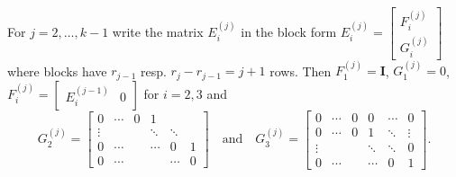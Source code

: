 \documentclass[11pt]{amsart}
\theoremstyle{definition}
\newcommand{\II}{\mathbf{I}}
\begin{document}
For $j=2,\ldots ,k-1$ write the matrix $E_i^{(j)}$ in the block form $E_i^{(j)}=\begin{bmatrix} F_i^{(j)} \\ G_i^{(j)}\end{bmatrix}$ where blocks have $r_{j-1}$ resp. $r_j-r_{j-1}=j+1$ rows. Then $F_1^{(j)}=\II$, $G_1^{(j)}=0$, $F_i^{(j)}=\begin{bmatrix}E_i^{(j-1)} & 0 \end{bmatrix}$ for $i=2,3$ and
\begin{equation}\label{eq: G_i}
G_2^{(j)}=\begin{bmatrix}
0 & \cdots & 0 & 1\\
\vdots & & & \ddots & \ddots\\
0 & \cdots & & \cdots & 0 & 1\\
0 & \cdots & & & \cdots & 0
\end{bmatrix} \quad \mathrm{and}\quad G_3^{(j)}=\begin{bmatrix}
0 & \cdots & 0 & 0 & \cdots & 0\\
0 & \cdots & 0 & 1 & \ddots & \vdots \\
\vdots & &  & \ddots & \ddots & 0\\
0 & \cdots & & \cdots & 0 & 1
\end{bmatrix}.
\end{equation}
\end{document}
